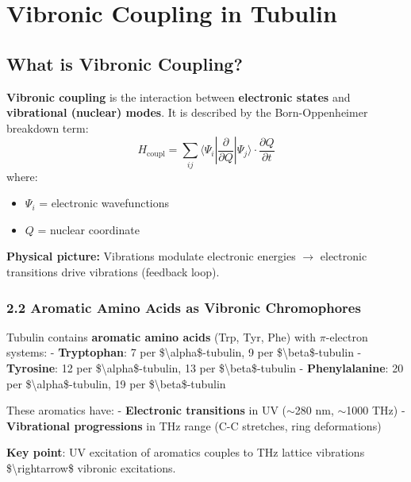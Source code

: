 \section{Vibronic Coupling in Tubulin}
\label{sec:vibronic-coupling}

\subsection{What is Vibronic Coupling?}
\label{subsec:vibronic-definition}

\textbf{Vibronic coupling} is the interaction between \textbf{electronic states} and \textbf{vibrational (nuclear) modes}. It is described by the Born-Oppenheimer breakdown term:
\begin{equation}
\label{eq:vibronic-coupling}
H_{\text{coupl}} = \sum_{ij} \langle \Psi_i | \frac{\partial}{\partial Q} | \Psi_j \rangle \cdot \frac{\partial Q}{\partial t}
\end{equation}
where:
\begin{itemize}
\item $\Psi_i$ = electronic wavefunctions
\item $Q$ = nuclear coordinate
\end{itemize}

\textbf{Physical picture:} Vibrations modulate electronic energies $\rightarrow$ electronic transitions drive vibrations (feedback loop).

\subsubsection{2.2 Aromatic Amino Acids as Vibronic
Chromophores}\label{aromatic-amino-acids-as-vibronic-chromophores}

Tubulin contains \textbf{aromatic amino acids} (Trp, Tyr, Phe) with
\(\pi\)-electron systems: - \textbf{Tryptophan}: 7 per
\$\textbackslash alpha\$-tubulin, 9 per \$\textbackslash beta\$-tubulin
- \textbf{Tyrosine}: 12 per \$\textbackslash alpha\$-tubulin, 13 per
\$\textbackslash beta\$-tubulin - \textbf{Phenylalanine}: 20 per
\$\textbackslash alpha\$-tubulin, 19 per \$\textbackslash beta\$-tubulin

These aromatics have: - \textbf{Electronic transitions} in UV
($\sim$280 nm, $\sim$1000 THz) - \textbf{Vibrational
progressions} in THz range (C-C stretches, ring deformations)

\textbf{Key point}: UV excitation of aromatics couples to THz lattice
vibrations \$\textbackslash rightarrow\$ vibronic excitations.

